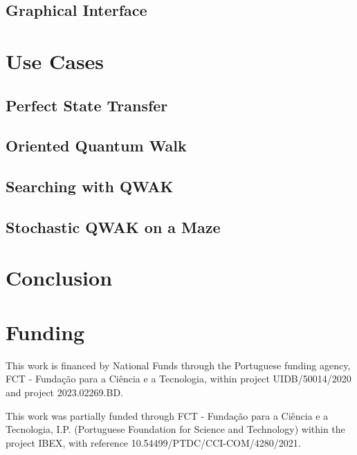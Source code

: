 \documentclass[preprint,12pt]{elsarticle}
\begin{document}
    \subsection{Graphical Interface}
        

\section{Use Cases}\label{sec:use_cases}
    
    \subsection{Perfect State Transfer}
        
    \subsection{Oriented Quantum Walk}
        
    \subsection{Searching with QWAK}
        
    \subsection{Stochastic QWAK on a Maze}
        


\section{Conclusion}\label{sec:conclusion}
    

\clearpage

\section*{Funding}
This work is financed by National Funds through the Portuguese funding agency,
FCT - Fundação para a Ciência e a Tecnologia, within project UIDB/50014/2020 and project 2023.02269.BD. 

This work was partially funded  through FCT - Fundação para a Ciência e a Tecnologia, I.P. (Portuguese Foundation for Science and Technology) within the project IBEX, with reference 10.54499/PTDC/CCI-COM/4280/2021.
\end{document}
